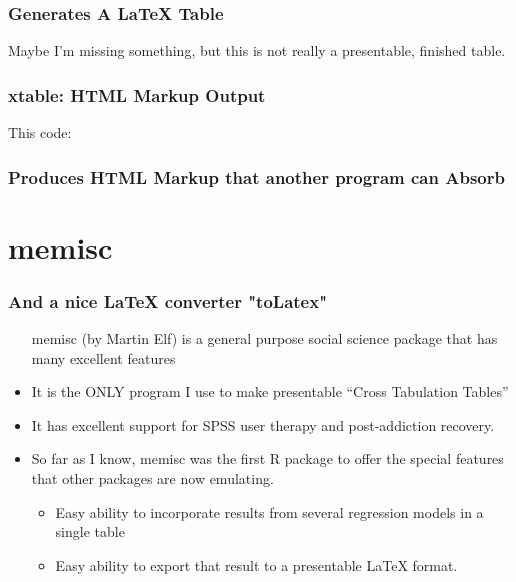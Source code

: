 \documentclass[11pt,english]{beamer}
\def\lyxframeend{} %
\def\Sweavesize{\normalsize}
\begin{document}
\begin{frame}[containsverbatim]
\frametitle{Generates A LaTeX Table}




Maybe I'm missing something, but this is not really a presentable,
finished table.

\end{frame}

\begin{frame}[containsverbatim]
\frametitle{xtable: HTML Markup Output}


This code:



\end{frame}

\begin{frame}[containsverbatim]
\frametitle{Produces HTML Markup that another program can Absorb}


\def\Sweavesize{\scriptsize}


\end{frame}


\lyxframeend{}\section{memisc}

\begin{frame}[containsverbatim]
\frametitle{And a nice LaTeX converter "toLatex"}
\begin{itemize}
\item [memisc] (by Martin Elf) is a general purpose social science package
that has many excellent features
\item It is the ONLY program I use to make presentable ``Cross Tabulation
Tables''
\item It has excellent support for SPSS user therapy and post-addiction
recovery.
\item So far as I know, memisc was the first R package to offer the special
features that other packages are now emulating.

\begin{itemize}
\item Easy ability to incorporate results from several regression models
in a single table
\item Easy ability to export that result to a presentable \LaTeX{} format.
\end{itemize}
\end{itemize}
\end{frame}
\end{document}
